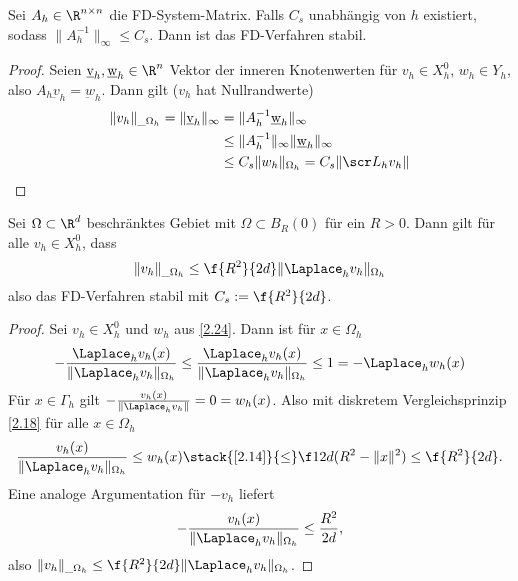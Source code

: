 \begin{st} \label{2.22}
	Sei $A_h \in \R^{n\times n}$ die FD-System-Matrix.
	Falls $C_s$ unabhängig von $h$ existiert, sodass $\|A_h^{-1}\|_\infty \le C_s$.
	Dann ist das FD-Verfahren stabil.
	\begin{proof}
		Seien $\underbar{v}_h, \underbar{w}_h \in \R^n$ Vektor der inneren Knotenwerten für $v_h \in X_h^0$, $w_h \in Y_h$, also $A_h \underbar{v}_h = \underbar{w}_h$.
		Dann gilt ($v_h$ hat Nullrandwerte)
		\begin{align*}
			\|v_h\|_{\_\Omega_h}
			= \|\underbar{v}_h\|_\infty
			&= \|A_h^{-1} \underbar{w}_h\|_\infty \\
			&\le \|A_h^{-1}\|_\infty \|\underbar{w}_h\|_\infty \\
			&\le C_s \|w_h\|_{\Omega_h}
			= C_s \|\scr L_h v_h\|
		\end{align*}
	\end{proof}
\end{st}

\begin{st} \label{2.23}
	Sei $\Omega \subset \R^d$ beschränktes Gebiet mit $\Omega \subset B_R(0)$ für ein $R > 0$.
	Dann gilt für alle $v_h \in X_h^0$, dass
	\[
		\|v_h\|_{\_\Omega_h} \le \f {R^2}{2d} \|\Laplace_h v_h\|_{\Omega_h}
	\]
	also das FD-Verfahren stabil mit $C_s := \f {R^2}{2d}$.
	\begin{proof}
		Sei $v_h \in X_h^0$ und $w_h$ aus \ref{2.24}.
		Dann ist für $x \in \Omega_h$
		\[
			- \frac{\Laplace_h v_h(x)}{\|\Laplace_h v_h\|_{\Omega_h}}
			\le \frac{\Laplace_h v_h(x)}{\|\Laplace_h v_h\|_{\Omega_h}}
			\le 1
			= - \Laplace_h w_h(x)
		\]
		Für $x \in \Gamma_h$ gilt $- \frac{v_h(x)}{\|\Laplace_h v_h\|} = 0 = w_h(x)$.
		Also mit diskretem Vergleichsprinzip \ref{2.18} für alle $x \in \Omega_h$
		\[
			\frac{v_h(x)}{\|\Laplace_h v_h\|_{\Omega_h}}
			\le w_h(x)
			\stack{\ref{2.14}}{\le} \f 1{2d} (R^2 - \|x\|^2)
			\le \f {R^2}{2d}.
		\]
		Eine analoge Argumentation für $-v_h$ liefert
		\[
			- \frac{v_h(x)}{\|\Laplace_h v_h\|_{\Omega_h}}
			\le \frac{R^2}{2d},
		\]
		also $\|v_h\|_{\_\Omega_h} \le \f {R^2}{2d} \|\Laplace_h v_h\|_{\Omega_h}$.
	\end{proof}
\end{st}

